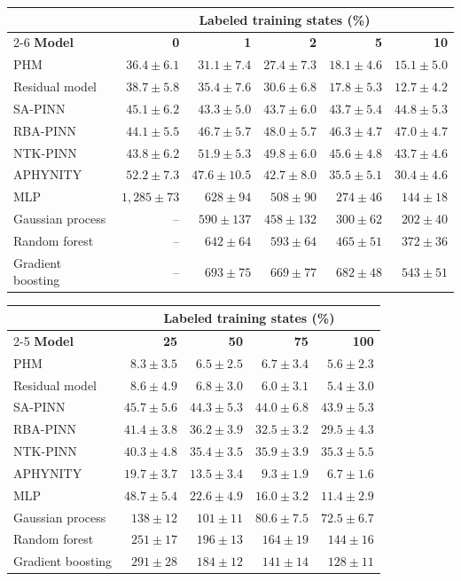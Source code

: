 \begin{tabular}{lrrrrr}
\toprule
 & \multicolumn{5}{c}{\textbf{Labeled training states (\%)}} \\
\cmidrule(l){2-6}
\textbf{Model} & \textbf{0} & \textbf{1} & \textbf{2} & \textbf{5} & \textbf{10} \\
\midrule
PHM & $36.4 \pm 6.1$ & $31.1 \pm 7.4$ & $27.4 \pm 7.3$ & $18.1 \pm 4.6$ & $15.1 \pm 5.0$ \\
Residual model & $38.7 \pm 5.8$ & $35.4 \pm 7.6$ & $30.6 \pm 6.8$ & $17.8 \pm 5.3$ & $12.7 \pm 4.2$ \\
SA-PINN & $45.1 \pm 6.2$ & $43.3 \pm 5.0$ & $43.7 \pm 6.0$ & $43.7 \pm 5.4$ & $44.8 \pm 5.3$ \\
RBA-PINN & $44.1 \pm 5.5$ & $46.7 \pm 5.7$ & $48.0 \pm 5.7$ & $46.3 \pm 4.7$ & $47.0 \pm 4.7$ \\
NTK-PINN & $43.8 \pm 6.2$ & $51.9 \pm 5.3$ & $49.8 \pm 6.0$ & $45.6 \pm 4.8$ & $43.7 \pm 4.6$ \\
APHYNITY & $52.2 \pm 7.3$ & $47.6 \pm 10.5$ & $42.7 \pm 8.0$ & $35.5 \pm 5.1$ & $30.4 \pm 4.6$ \\
MLP & $1{,}285 \pm 73$ & $628 \pm 94$ & $508 \pm 90$ & $274 \pm 46$ & $144 \pm 18$ \\
Gaussian process & -- & $590 \pm 137$ & $458 \pm 132$ & $300 \pm 62$ & $202 \pm 40$ \\
Random forest & -- & $642 \pm 64$ & $593 \pm 64$ & $465 \pm 51$ & $372 \pm 36$ \\
Gradient boosting & -- & $693 \pm 75$ & $669 \pm 77$ & $682 \pm 48$ & $543 \pm 51$ \\
\bottomrule
\end{tabular}

\vspace{1.5mm}
\begin{tabular}{lrrrr}
\toprule
 & \multicolumn{4}{c}{\textbf{Labeled training states (\%)}} \\
\cmidrule(l){2-5}
\textbf{Model} & \textbf{25} & \textbf{50} & \textbf{75} & \textbf{100} \\
\midrule
PHM & $8.3 \pm 3.5$ & $6.5 \pm 2.5$ & $6.7 \pm 3.4$ & $5.6 \pm 2.3$ \\
Residual model & $8.6 \pm 4.9$ & $6.8 \pm 3.0$ & $6.0 \pm 3.1$ & $5.4 \pm 3.0$ \\
SA-PINN & $45.7 \pm 5.6$ & $44.3 \pm 5.3$ & $44.0 \pm 6.8$ & $43.9 \pm 5.3$ \\
RBA-PINN & $41.4 \pm 3.8$ & $36.2 \pm 3.9$ & $32.5 \pm 3.2$ & $29.5 \pm 4.3$ \\
NTK-PINN & $40.3 \pm 4.8$ & $35.4 \pm 3.5$ & $35.9 \pm 3.9$ & $35.3 \pm 5.5$ \\
APHYNITY & $19.7 \pm 3.7$ & $13.5 \pm 3.4$ & $9.3 \pm 1.9$ & $6.7 \pm 1.6$ \\
MLP & $48.7 \pm 5.4$ & $22.6 \pm 4.9$ & $16.0 \pm 3.2$ & $11.4 \pm 2.9$ \\
Gaussian process & $138 \pm 12$ & $101 \pm 11$ & $80.6 \pm 7.5$ & $72.5 \pm 6.7$ \\
Random forest & $251 \pm 17$ & $196 \pm 13$ & $164 \pm 19$ & $144 \pm 16$ \\
Gradient boosting & $291 \pm 28$ & $184 \pm 12$ & $141 \pm 14$ & $128 \pm 11$ \\
\bottomrule
\end{tabular}
